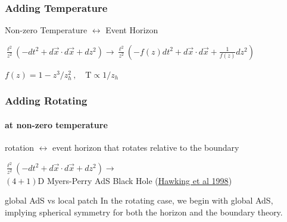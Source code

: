 \documentclass[xcolor=dvipsnames]{beamer}
\begin{document}
\begin{frame}
  \frametitle{Adding Temperature}

  \begin{block}{}Non-zero Temperature $\longleftrightarrow$ Event Horizon\end{block}

  \begin{block}{}
    $\frac {\ell^2}{z^2} \left( -dt^2 + d\vec x\cdot d\vec x + dz^2 \right) \rightarrow \frac {\ell^2}{z^2} \left( -f(z) dt^2 + d\vec x\cdot d\vec x + \frac 1{f(z)}dz^2 \right)$

    $ f(z) = 1 - z^3/z_h^2\,, \quad \mathrm T \propto 1/z_h $
  \end{block}

  \begin{center}
  \end{center}
\end{frame}

\begin{frame}
  \frametitle{Adding Rotating}
  \framesubtitle{at non-zero temperature}

  \begin{block}{}rotation $\longleftrightarrow$ event horizon that rotates relative to the boundary\end{block}

  \begin{block}{}
    $\frac {\ell^2}{z^2} \left( -dt^2 + d\vec x\cdot d\vec x + dz^2 \right) \rightarrow$ \\$(4+1)$D Myers-Perry AdS Black Hole (\href{https://inspirehep.net/literature/478927}{Hawking et al 1998})
  \end{block}

  \begin{alertblock}{global AdS vs local patch}
    In the rotating case, we begin with global AdS, implying spherical symmetry for both the horizon and the boundary theory.
  \end{alertblock}


\end{frame}
\end{document}
